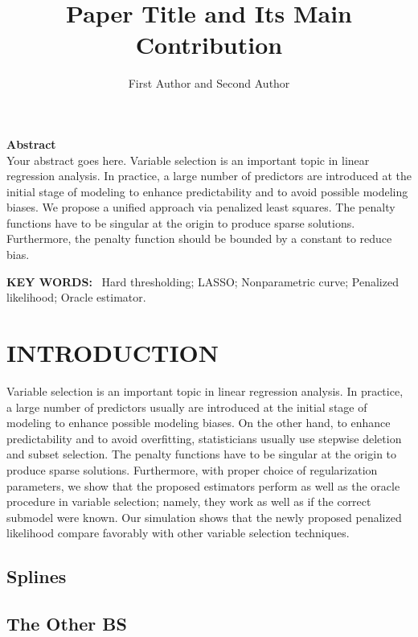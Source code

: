 \documentclass[8pt,twocolumn]{article}
\title{\textbf{Paper Title and Its Main Contribution}}
\author{First Author and Second Author\\
}
\date{}
\newenvironment{abstractbox}{%
  \begin{mdframed}[backgroundcolor=lightgray,
                   linewidth=0.5pt,
                   linecolor=black,
                   topline=true,
                   bottomline=true,
                   leftline=true,
                   rightline=true,
                   innerleftmargin=10pt,
                   innerrightmargin=10pt,
                   innertopmargin=10pt,
                   innerbottommargin=10pt]
}{%
  \end{mdframed}
}
\begin{document}
\maketitle

\begin{abstractbox}
\noindent\textbf{Abstract} \\
Your abstract goes here. Variable selection is an important topic in linear regression analysis. In practice, a large number of predictors are introduced at the initial stage of modeling to enhance predictability and to avoid possible modeling biases. We propose a unified approach via penalized least squares. The penalty functions have to be singular at the origin to produce sparse solutions. Furthermore, the penalty function should be bounded by a constant to reduce bias.

\vspace{0.5em}
\noindent\textbf{KEY WORDS:} \ Hard thresholding; LASSO; Nonparametric curve; Penalized likelihood; Oracle estimator.
\end{abstractbox}


\section{INTRODUCTION}

Variable selection is an important topic in linear regression analysis. In practice, a large number of predictors usually are introduced at the initial stage of modeling to enhance possible modeling biases. On the other hand, to enhance predictability and to avoid overfitting, statisticians usually use stepwise deletion and subset selection. The penalty functions have to be singular at the origin to produce sparse solutions. Furthermore, with proper choice of regularization parameters, we show that the proposed estimators perform as well as the oracle procedure in variable selection; namely, they work as well as if the correct submodel were known. Our simulation shows that the newly proposed penalized likelihood compare favorably with other variable selection techniques.

\subsection{Splines}

\subsection{The Other BS}
\end{document}
